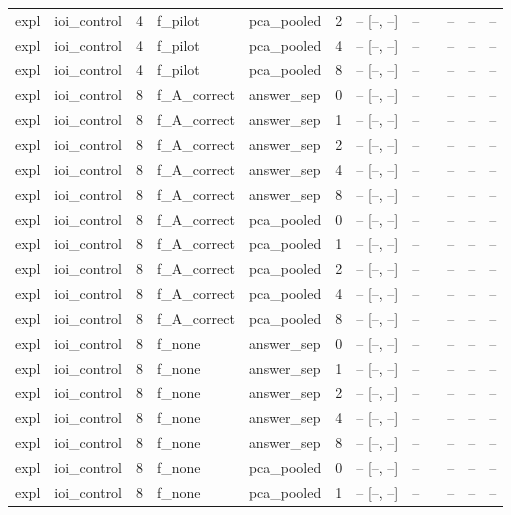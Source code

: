 \begin{tabular}{llrllrrrlrrr}
expl & ioi\_control & 4 & f\_pilot & pca\_pooled & 2 & -- [--, --] & -- &  & -- & -- & -- \\
expl & ioi\_control & 4 & f\_pilot & pca\_pooled & 4 & -- [--, --] & -- &  & -- & -- & -- \\
expl & ioi\_control & 4 & f\_pilot & pca\_pooled & 8 & -- [--, --] & -- &  & -- & -- & -- \\
expl & ioi\_control & 8 & f\_A\_correct & answer\_sep & 0 & -- [--, --] & -- &  & -- & -- & -- \\
expl & ioi\_control & 8 & f\_A\_correct & answer\_sep & 1 & -- [--, --] & -- &  & -- & -- & -- \\
expl & ioi\_control & 8 & f\_A\_correct & answer\_sep & 2 & -- [--, --] & -- &  & -- & -- & -- \\
expl & ioi\_control & 8 & f\_A\_correct & answer\_sep & 4 & -- [--, --] & -- &  & -- & -- & -- \\
expl & ioi\_control & 8 & f\_A\_correct & answer\_sep & 8 & -- [--, --] & -- &  & -- & -- & -- \\
expl & ioi\_control & 8 & f\_A\_correct & pca\_pooled & 0 & -- [--, --] & -- &  & -- & -- & -- \\
expl & ioi\_control & 8 & f\_A\_correct & pca\_pooled & 1 & -- [--, --] & -- &  & -- & -- & -- \\
expl & ioi\_control & 8 & f\_A\_correct & pca\_pooled & 2 & -- [--, --] & -- &  & -- & -- & -- \\
expl & ioi\_control & 8 & f\_A\_correct & pca\_pooled & 4 & -- [--, --] & -- &  & -- & -- & -- \\
expl & ioi\_control & 8 & f\_A\_correct & pca\_pooled & 8 & -- [--, --] & -- &  & -- & -- & -- \\
expl & ioi\_control & 8 & f\_none & answer\_sep & 0 & -- [--, --] & -- &  & -- & -- & -- \\
expl & ioi\_control & 8 & f\_none & answer\_sep & 1 & -- [--, --] & -- &  & -- & -- & -- \\
expl & ioi\_control & 8 & f\_none & answer\_sep & 2 & -- [--, --] & -- &  & -- & -- & -- \\
expl & ioi\_control & 8 & f\_none & answer\_sep & 4 & -- [--, --] & -- &  & -- & -- & -- \\
expl & ioi\_control & 8 & f\_none & answer\_sep & 8 & -- [--, --] & -- &  & -- & -- & -- \\
expl & ioi\_control & 8 & f\_none & pca\_pooled & 0 & -- [--, --] & -- &  & -- & -- & -- \\
expl & ioi\_control & 8 & f\_none & pca\_pooled & 1 & -- [--, --] & -- &  & -- & -- & -- \\

\end{tabular}
